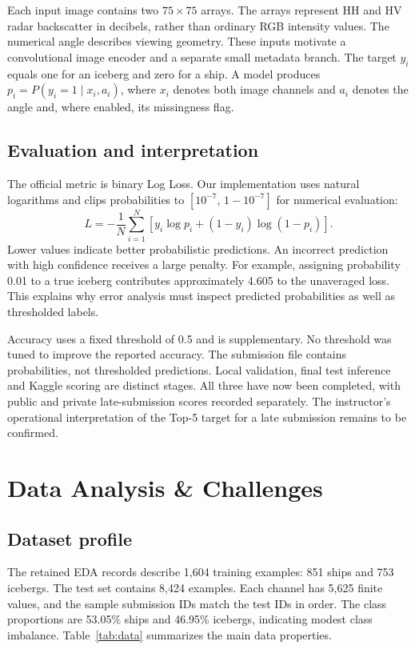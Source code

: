 \documentclass[journal]{IEEEtran}
\begin{document}
Each input image contains two $75\times75$ arrays. The arrays represent HH and HV radar backscatter in decibels, rather than ordinary RGB intensity values. The numerical angle describes viewing geometry. These inputs motivate a convolutional image encoder and a separate small metadata branch. The target $y_i$ equals one for an iceberg and zero for a ship. A model produces $p_i=P(y_i=1\mid x_i,a_i)$, where $x_i$ denotes both image channels and $a_i$ denotes the angle and, where enabled, its missingness flag.

\subsection{Evaluation and interpretation}
The official metric is binary Log Loss. Our implementation uses natural logarithms and clips probabilities to \mbox{$[10^{-7},\,1-10^{-7}]$} for numerical evaluation:
\begin{equation}
L=-\frac{1}{N}\sum_{i=1}^{N}\left[y_i\log p_i+(1-y_i)\log(1-p_i)\right].
\end{equation}
Lower values indicate better probabilistic predictions. An incorrect prediction with high confidence receives a large penalty. For example, assigning probability 0.01 to a true iceberg contributes approximately 4.605 to the unaveraged loss. This explains why error analysis must inspect predicted probabilities as well as thresholded labels.

Accuracy uses a fixed threshold of 0.5 and is supplementary. No threshold was tuned to improve the reported accuracy. The submission file contains probabilities, not thresholded predictions. Local validation, final test inference and Kaggle scoring are distinct stages. All three have now been completed, with public and private late-submission scores recorded separately. The instructor's operational interpretation of the Top-5 target for a late submission remains to be confirmed.

\section{Data Analysis \& Challenges}
\subsection{Dataset profile}
The retained EDA records describe 1,604 training examples: 851 ships and 753 icebergs. The test set contains 8,424 examples. Each channel has 5,625 finite values, and the sample submission IDs match the test IDs in order. The class proportions are 53.05\% ships and 46.95\% icebergs, indicating modest class imbalance. Table~\ref{tab:data} summarizes the main data properties.
\end{document}
